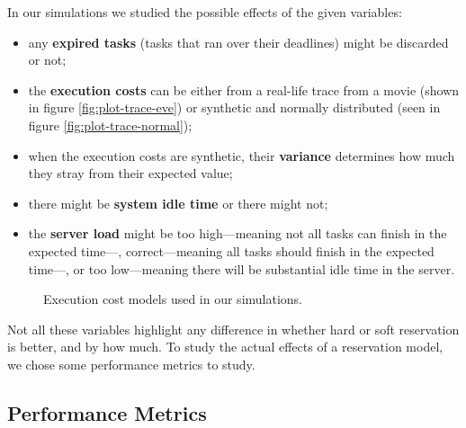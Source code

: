 \documentclass[times, 10pt,twocolumn]{article}
\begin{document}
In our simulations we studied the possible effects of the given
variables:
\begin{itemize}
\item any \textbf{expired tasks} (tasks that ran over their deadlines)
  might be discarded or not;
\item the \textbf{execution costs} can be either from a real-life
  trace from a movie (shown in figure \ref{fig:plot-trace-eve}) or
  synthetic and normally distributed (seen in figure
  \ref{fig:plot-trace-normal});
\item when the execution costs are synthetic, their \textbf{variance}
  determines how much they stray from their expected value;
\item there might be \textbf{system idle time} or there might not;
\item the \textbf{server load} might be too high---meaning not all
  tasks can finish in the expected time---, correct---meaning all
  tasks should finish in the expected time---, or too low---meaning
  there will be substantial idle time in the server.
\end{itemize}

\begin{figure*}[t]
  \centering
  \caption{Execution cost models used in our simulations.}
\end{figure*}

Not all these variables highlight any difference in whether hard or
soft reservation is better, and by how much. To study the actual
effects of a reservation model, we chose some performance metrics to study.

\subsection{Performance Metrics}
\label{sec:metrics}
\end{document}
